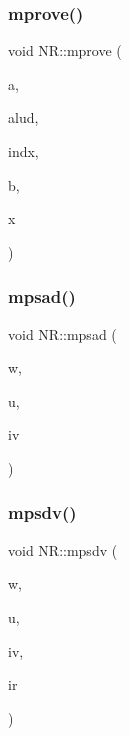 \subsubsection{\texorpdfstring{mprove()}{mprove()}}
{\footnotesize\ttfamily void N\+R\+::mprove (\begin{DoxyParamCaption}\item[{\mbox{\hyperlink{namespaceNR_a2b8abfda8fffad6ba0a1b5a4c0773dbf}{Mat\+\_\+\+I\+\_\+\+DP}} \&}]{a,  }\item[{\mbox{\hyperlink{namespaceNR_a2b8abfda8fffad6ba0a1b5a4c0773dbf}{Mat\+\_\+\+I\+\_\+\+DP}} \&}]{alud,  }\item[{\mbox{\hyperlink{namespaceNR_ae67ce7dc86a8a64a7ce73c3c030ff610}{Vec\+\_\+\+I\+\_\+\+I\+NT}} \&}]{indx,  }\item[{\mbox{\hyperlink{namespaceNR_a9f943da53862537c552e2a770cb170ae}{Vec\+\_\+\+I\+\_\+\+DP}} \&}]{b,  }\item[{\mbox{\hyperlink{namespaceNR_ab293e06a6bf799d8a7ed932b6852bcb8}{Vec\+\_\+\+I\+O\+\_\+\+DP}} \&}]{x }\end{DoxyParamCaption})}

\mbox{\label{namespaceNR_a73ec9a62342ed00c7ed70bfedecf5947}} 
\subsubsection{\texorpdfstring{mpsad()}{mpsad()}}
{\footnotesize\ttfamily void N\+R\+::mpsad (\begin{DoxyParamCaption}\item[{\mbox{\hyperlink{namespaceNR_ac322e5f1208609bf101390ed2495b7d5}{Vec\+\_\+\+O\+\_\+\+U\+C\+HR}} \&}]{w,  }\item[{\mbox{\hyperlink{namespaceNR_ace0fbcd7daadfbf5e4e7db2a317a5b46}{Vec\+\_\+\+I\+\_\+\+U\+C\+HR}} \&}]{u,  }\item[{const int}]{iv }\end{DoxyParamCaption})}

\mbox{\label{namespaceNR_afb23bc7a9b2440c5a3db4da885920358}} 
\subsubsection{\texorpdfstring{mpsdv()}{mpsdv()}}
{\footnotesize\ttfamily void N\+R\+::mpsdv (\begin{DoxyParamCaption}\item[{\mbox{\hyperlink{namespaceNR_ac322e5f1208609bf101390ed2495b7d5}{Vec\+\_\+\+O\+\_\+\+U\+C\+HR}} \&}]{w,  }\item[{\mbox{\hyperlink{namespaceNR_ace0fbcd7daadfbf5e4e7db2a317a5b46}{Vec\+\_\+\+I\+\_\+\+U\+C\+HR}} \&}]{u,  }\item[{const int}]{iv,  }\item[{int \&}]{ir }\end{DoxyParamCaption})}

